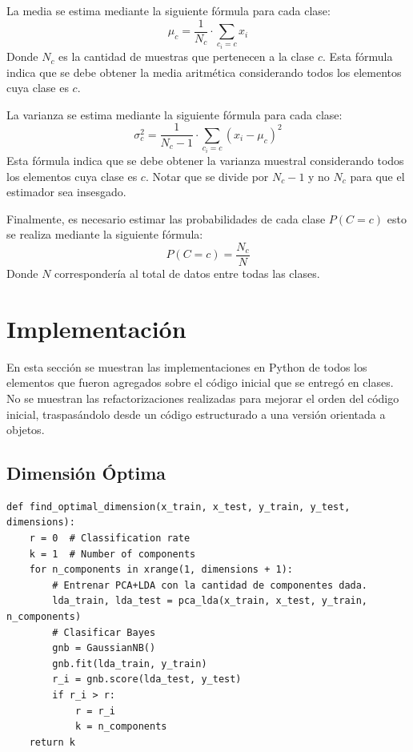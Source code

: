 \documentclass[letter, titlepage, 10pt]{article}
\begin{document}
La media se estima mediante la siguiente fórmula para cada clase:
\begin{equation}
\mu_c = \frac{1}{N_c}\cdot \sum\limits_{c_i = c}{x_i}
\end{equation}
Donde $N_c$ es la cantidad de muestras que pertenecen a la clase $c$. Esta fórmula indica que se debe obtener la media aritmética considerando todos los elementos cuya clase es $c$.

La varianza se estima mediante la siguiente fórmula para cada clase:
\begin{equation}
\sigma_c^2 = \frac{1}{N_c-1}\cdot \sum\limits_{c_i = c}{(x_i-\mu_c)^2}
\end{equation}
Esta fórmula indica que se debe obtener la varianza muestral considerando todos los elementos cuya clase es $c$. Notar que se divide por $N_c-1$ y no $N_c$ para que el estimador sea insesgado.

Finalmente, es necesario estimar las probabilidades de cada clase $P(C = c)$ esto se realiza mediante la siguiente fórmula:
\begin{equation}
P(C = c) = \frac{N_c}{N}
\end{equation}
Donde $N$ correspondería al total de datos entre todas las clases.


\newpage

\section{Implementación}

En esta sección se muestran las implementaciones en Python de todos los elementos que fueron agregados sobre el código inicial que se entregó en clases. No se muestran las refactorizaciones realizadas para mejorar el orden del código inicial, traspasándolo desde un código estructurado a una versión orientada a objetos. 


\subsection{Dimensión Óptima}
\begin{lstlisting}
def find_optimal_dimension(x_train, x_test, y_train, y_test, dimensions):
    r = 0  # Classification rate
    k = 1  # Number of components
    for n_components in xrange(1, dimensions + 1):
        # Entrenar PCA+LDA con la cantidad de componentes dada.
        lda_train, lda_test = pca_lda(x_train, x_test, y_train, n_components)
        # Clasificar Bayes
        gnb = GaussianNB()
        gnb.fit(lda_train, y_train)
        r_i = gnb.score(lda_test, y_test)
        if r_i > r:
            r = r_i
            k = n_components
    return k
\end{lstlisting}
\end{document}

